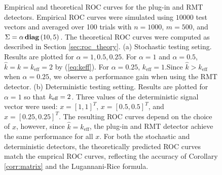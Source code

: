 \begin{figure}
\centering
{}
\vspace{-0.1in}
\caption{Empirical and theoretical ROC curves for the plug-in and RMT detectors. Empirical ROC curves were simulated using $10000$ test vectors and averaged over 100 trials with $n=1000$, $m=500$, and $\Sigma =\alpha\mathop{\bf diag}\left(10,5\right)$. The theoretical ROC curves were computed as described in Section \ref{sec:roc_theory}. (a) Stochastic testing seting. Results are plotted for $\alpha=1,0.5,0.25$. For $\alpha=1$ and $\alpha=0.5$, $\widehat{k}=k=k_\text{eff}=2$ by (\ref{eq:keff}). For $\alpha=0.25$, $k_\text{eff}=1$.Since $\widehat{k} > k_{\text{eff}}$ when $\alpha=0.25$, we observe a performance gain when using the RMT detector. (b) Deterministic testing setting. Results are plotted for $\alpha=1$ so that $k_\text{eff}=2$. Three values of the deterministic signal vector were used: $x=[1,1]^T$, $x=[0.5,0.5]^T$, and $x=[0.25,0.25]^T$. The resulting ROC curves depend on the choice of $x$, however, since $\widehat{k} = k_{\text{eff}}$, the plug-in and RMT detector achieve the same performance for all $x$. For both the stochastic and deterministic detectors, the theoretically predicted ROC curves match the emprical ROC curves, reflecting the accuracy of Corollary \ref{corr:matrix} and the Lugannani-Rice formula.}
\vspace{-0.3in}
\end{figure}


